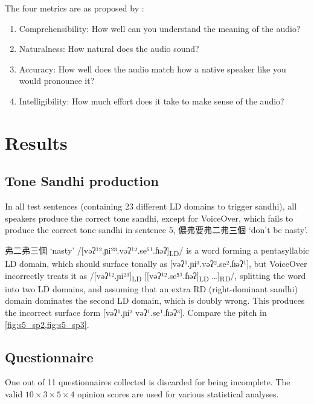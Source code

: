 \documentclass[11pt]{article}
\begin{document}
The four metrics are as proposed by \citet{cardosoEvaluatingTexttospeechSynthesizers2015}:
\begin{enumerate}
    \item Comprehensibility: How well can you understand the meaning of the audio?
    \item Naturalness: How natural does the audio sound?
    \item Accuracy: How well does the audio match how a native speaker like you would pronounce it?
    \item Intelligibility: How much effort does it take to make sense of the audio?
\end{enumerate}

\section{Results}
\subsection{Tone Sandhi production}
In all test sentences (containing 23 different LD domains to trigger sandhi), all speakers produce the correct tone sandhi, except for VoiceOver, which fails to produce the correct tone sandhi in sentence 5, 儂弗要弗二弗三個 `don't be nasty'.

弗二弗三個 `nasty' /[vəʔ¹².ɲi²³.vəʔ¹².se⁵¹.ɦəʔ]\textsubscript{LD}/ is a word forming a pentasyllabic LD domain, which should surface tonally as [vəʔ¹.ɲi³.vəʔ².se².ɦəʔ¹], but VoiceOver incorrectly treats it as /[vəʔ¹².ɲi²³]\textsubscript{LD} [[vəʔ¹².se⁵¹.ɦəʔ]\textsubscript{LD} \ldots]\textsubscript{RD}/, splitting the word into two LD domains, and assuming that an extra RD (right-dominant sandhi) domain dominates the second LD domain, which is doubly wrong. This produces the incorrect surface form [vəʔ¹.ɲi³ vəʔ¹.se¹.ɦəʔ³].
Compare the pitch in \cref{fig:s5_sp2,fig:s5_sp3}.

\subsection{Questionnaire}
One out of 11 questionnaires collected is discarded for being incomplete. The valid $10 \times 3 \times 5 \times 4$ opinion scores are used for various statistical analyses.
\end{document}
